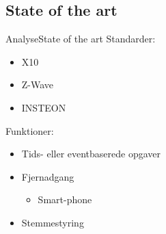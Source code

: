 \subsection{State of the art}
\begin{frame}{Analyse}{State of the art}
Standarder:
\begin{itemize}
\item X10
\item Z-Wave
\item INSTEON\newline
\end{itemize}
Funktioner:
\begin{itemize}
\item Tids- eller eventbaserede opgaver
\item Fjernadgang
\begin{itemize}
\item Smart-phone
\end{itemize}
\item Stemmestyring
\end{itemize}
\end{frame}

